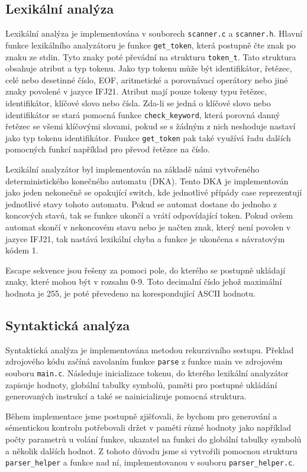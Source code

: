 \documentclass[11pt]{article}
\begin{document}
\subsection{Lexikální analýza}
Lexikální analýza je implementována v souborech \texttt{scanner.c} a \texttt{scanner.h}. Hlavní funkce lexikálního analyzátoru je funkce \texttt{get\_token},
která postupně čte znak po znaku ze stdin. Tyto znaky poté převádní na strukturu \texttt{token\_t}. Tato struktura obsahuje atribut a typ tokenu.
Jako typ tokenu může být identifikátor, řetězec, celé nebo desetinné číslo, EOF, aritmetické a porovnávací operátory nebo jiné znaky povolené v jazyce IFJ21.
Atribut mají pouze tokeny typu řetězec, identifikátor, klíčové slovo nebo čísla. Zda-li se jedná o klíčové slovo nebo identifikátor
se stará pomocná funkce \texttt{check\_keyword}, která porovná danný řetězec se všemi klíčovými slovami, pokud se s žádným z nich neshoduje nastaví jako typ
tokenu identifikátor. Funkce \texttt{get\_token} pak také využívá řadu dalších pomocných funkcí například pro převod řetězce na číslo.

Lexikální analyzátor byl implementován na základě námi vytvořeného deterministického konečného automatu (DKA).
Tento DKA je implementován jako jeden nekonečně se opakující switch, kde jednotlivé přípády case reprezentují jednotlivé stavy tohoto automatu.
Pokud se automat dostane do jednoho z koncových stavů, tak se funkce ukončí a vrátí odpovídající token. Pokud ovšem
automat skončí v nekoncovém stavu nebo je načten znak, který není povolen v jazyce IFJ21, tak nastává lexikální chyba a funkce je ukončena s návratovým kódem 1.

Escape sekvence jsou řešeny za pomoci pole, do kterého se postupně ukládají znaky, které mohou být v rozsahu 0-9. Toto decimalní číslo jehož maximální
hodnota je 255, je poté převedeno na korespondující ASCII hodnotu.

\subsection{Syntaktická analýza}
Syntaktická analýza je implementována metodou rekurzivního sestupu. Překlad zdrojového kódu začíná zavolaním funkce
\texttt{parse} z funkce main ve zdrojovém souboru \texttt{main.c}. Následuje inicializace tokenu, do kterého lexikální analyzátor
zapisuje hodnoty, globální tabulky symbolů, paměti pro postupné ukládání generovaných instrukcí a také se nainicializuje pomocná struktura.

Během implementace jsme postupně zjišťovali,
že bychom pro generování a sémentickou kontrolu potřebovali držet v paměti různé hodnoty jako například počty parametrů u volání funkce,
 ukazatel na funkci do globální tabulky symbolů a několik dalších hodnot. Z tohoto důvodu jsme si vytvořili pomocnou strukturu
 \texttt{parser\_helper} a funkce nad ní, implementovanou v souboru \texttt{parser\_helper.c}.
\end{document}
